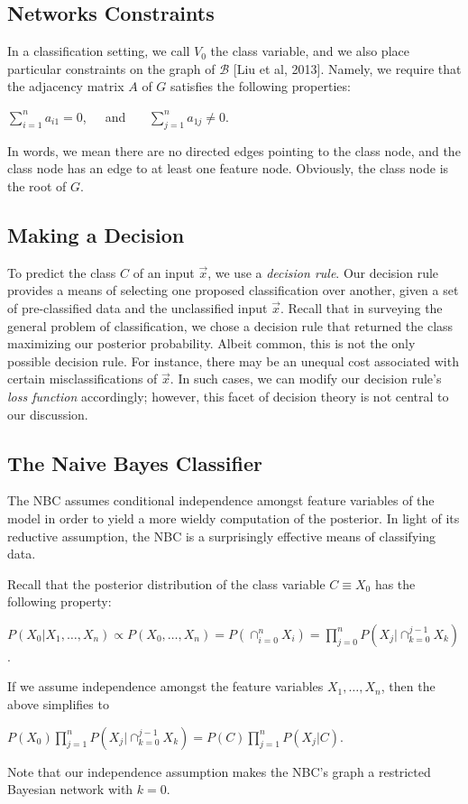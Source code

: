 \documentclass[12pt,twoside]{reedthesis}
\begin{document}
		\subsection*{Networks Constraints}
	In a classification setting, we call $V_0$ the class variable, and we also place particular constraints on the graph of $\mathcal{B}$ [Liu et al, 2013].
	Namely, we require that the adjacency matrix $A$ of $G$ satisfies the following properties:
	\begin{center}
		$\displaystyle\sum_{i=1}^{n}a_{i1} = 0$,\ \ \ and \ \ \ 
		$\displaystyle\sum_{j=1}^{n}a_{1j} \neq 0$.
	\end{center}
	In words, we mean there are no directed edges pointing to the class node, and the class node has an edge to at least one feature node. Obviously, the class node is the root of $G$.
		
		\subsection*{Making a Decision}
	
	To predict the class $C$ of an input $\vec{x}$, we use a {\em decision rule}.
	Our decision rule provides a means of selecting one proposed classification over another, given a set of pre-classified data and the unclassified input $\vec{x}$.
	Recall that in surveying the general problem of classification, we chose a decision rule that returned the class maximizing our posterior probability. 
	Albeit common, this is not the only possible decision rule. 
	For instance, there may be an unequal cost associated with certain misclassifications of $\vec{x}$. In such cases, we can modify our decision rule's {\em loss function} accordingly; however, this facet of decision theory is not central to our discussion.
	 
	\subsection*{The Naive Bayes Classifier} %
	The NBC assumes conditional independence amongst feature variables of the model in order to yield a more wieldy computation of the posterior. 
	In light of its reductive assumption, the NBC is a surprisingly effective means of classifying data.
	
	Recall that the posterior distribution of the class variable $C \equiv X_0$ has the following property:
	\begin{center}
		$P(X_0 | X_1, \ldots , X_n) \propto
		P(X_0,\ldots,X_n) = 
		P( \displaystyle\cap_{i=0}^{n} X_i) = 
		\displaystyle\prod_{j=0}^{n} P(X_j | \displaystyle\cap_{k=0}^{j-1}X_k)$.
	\end{center}
	If we assume independence amongst the feature variables $X_1,\ldots,X_n$, then the above simplifies to
	\begin{center}
		$P(X_0) \displaystyle\prod_{j=1}^{n} P(X_j | \displaystyle\cap_{k=0}^{j-1}X_k)
		= P(C) \displaystyle\prod_{j=1}^{n} P(X_j | C)$.
	\end{center}
	Note that our independence assumption makes the NBC's graph a restricted Bayesian network with $k = 0$.
\end{document}

